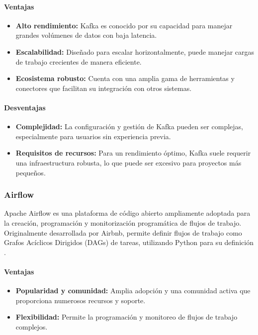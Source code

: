 \paragraph{Ventajas}
\begin{itemize}
    \item \textbf{Alto rendimiento:} Kafka es conocido por su capacidad para manejar grandes volúmenes de datos con baja latencia.
    \item \textbf{Escalabilidad:} Diseñado para escalar horizontalmente, puede manejar cargas de trabajo crecientes de manera eficiente.
    \item \textbf{Ecosistema robusto:} Cuenta con una amplia gama de herramientas y conectores que facilitan su integración con otros sistemas.
\end{itemize}

\paragraph{Desventajas}
\begin{itemize}
    \item \textbf{Complejidad:} La configuración y gestión de Kafka pueden ser complejas, especialmente para usuarios sin experiencia previa.
    \item \textbf{Requisitos de recursos:} Para un rendimiento óptimo, Kafka suele requerir una infraestructura robusta, lo que puede ser excesivo para proyectos más pequeños.
\end{itemize}

\subsubsection{Airflow}
Apache Airflow es una plataforma de código abierto ampliamente adoptada para la creación, programación y monitorización programática de flujos de trabajo. Originalmente desarrollada por Airbnb, permite definir flujos de trabajo como Grafos Acíclicos Dirigidos (DAGs) de tareas, utilizando Python para su definición \cite{noauthor_home_nodate}.

\paragraph{Ventajas}
\begin{itemize}
    \item \textbf{Popularidad y comunidad:} Amplia adopción y una comunidad activa que proporciona numerosos recursos y soporte.
    \item \textbf{Flexibilidad:} Permite la programación y monitoreo de flujos de trabajo complejos.
\end{itemize}

